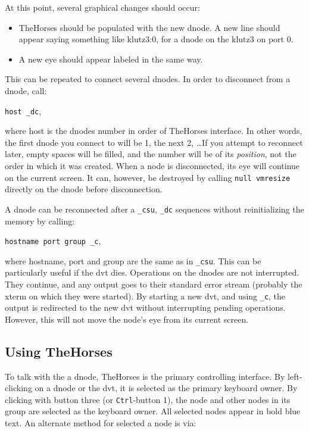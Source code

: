 \documentclass[12pt]{article}
\begin{document}
At this point, several graphical changes should occur:
\begin{itemize}
  \item TheHorses should be populated with the new dnode. A new line
  should appear saying something like klutz3:0, for a dnode on the
  klutz3 on port 0.
  \item A new eye should appear labeled in the same way.
\end{itemize}

This can be repeated to connect several dnodes. In order to disconnect
from a dnode, call:

\verb$host _dc$, 

where host is the dnodes number in order of TheHorses interface. In
other words, the first dnode you connect to will be 1, the next 2,
\dots If you attempt to reconnect later, empty spaces will be filled,
and the number will be of its \emph{position}, not the order in which
it was created.  When a node is disconnected, its eye will continue on
the current screen.  It can, however, be destroyed by calling
\verb$null vmresize$ directly on the dnode before disconnection.

A dnode can be reconnected after a \verb$_csu$, \verb$_dc$ sequences
without reinitializing the memory by calling:

\verb$hostname port group _c$,

where hostname, port and group are the same as in \verb$_csu$.  This
can be particularly useful if the dvt dies. Operations on the dnodes
are not interrupted. They continue, and any output goes to their
standard error stream (probably the xterm on which they were started).
By starting a new dvt, and using \verb$_c$, the output is redirected
to the new dvt without interrupting pending operations. However, this
will not move the node's eye from its current screen.


\subsection{Using TheHorses}
\label{sec:horses}

To talk with the a dnode, TheHorses is the primary controlling
interface. By left-clicking on a dnode or the dvt, it is selected as
the primary keyboard owner. By clicking with button three (or
\verb$Ctrl$-button 1), the node and other nodes in its group are
selected as the keyboard owner.  All selected nodes appear in bold
blue text. An alternate method for selected a node is via:
\end{document}
